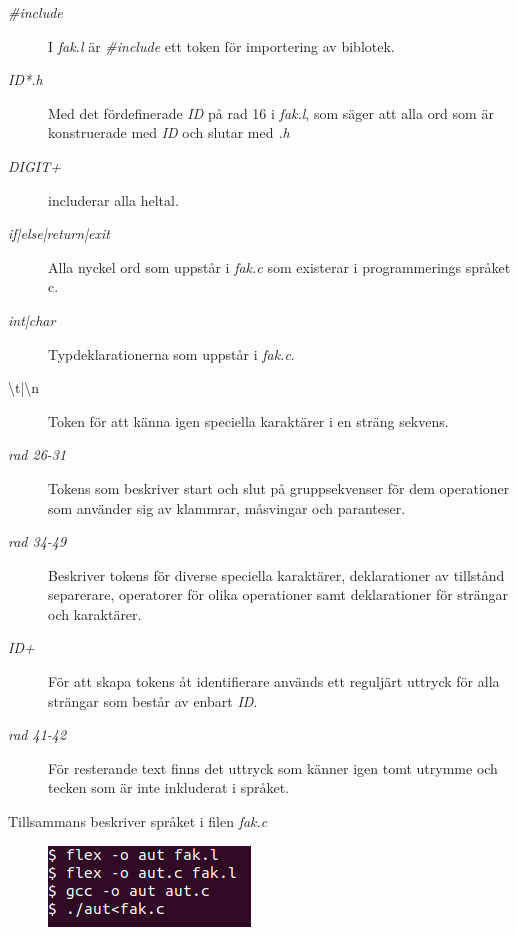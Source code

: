 \begin{description}

\item[\textit{\#include}] I \textit{fak.l} är \textit{\#include} ett token för importering av biblotek. 

\item[\textit{{ID}*.h}] Med det fördefinerade \textit{ID} på rad 16 i
\textit{fak.l}, som säger att alla ord som är konstruerade med \textit{ID} och slutar
med \textit{.h}

\item[\textit{{DIGIT}+}] includerar alla heltal.

\item[\textit{if|else|return|exit}] Alla nyckel ord som uppstår i \textit{fak.c }
som existerar i programmerings språket c.

\item[\textit{int|char}] Typdeklarationerna som uppstår i \textit{fak.c}. 

\item[\textbackslash t|\textbackslash n] Token för att känna igen speciella karaktärer i en sträng sekvens.

\item[\textit{rad 26-31}] Tokens som beskriver start och slut på gruppsekvenser för dem
operationer som använder sig av klammrar, måsvingar och paranteser.

\item[\textit{rad 34-49}] Beskriver tokens för diverse speciella karaktärer, deklarationer av
tillstånd separerare, operatorer för olika operationer samt deklarationer för strängar och
karaktärer.

\item[\textit{{ID}+}] För att skapa tokens åt identifierare används ett reguljärt uttryck för alla strängar som
består av enbart \textit{ID}.

\item[\textit{rad 41-42}] För resterande text finns det uttryck som känner igen tomt utrymme och
tecken som är inte inkluderat i språket.

\end{description}

 Tillsammans beskriver språket i filen \textit{fak.c}


\begin{figure}
    \includegraphics[width=\linewidth]{bilder/flex_command.png}
    \label{fig:flex}
\end{figure}

